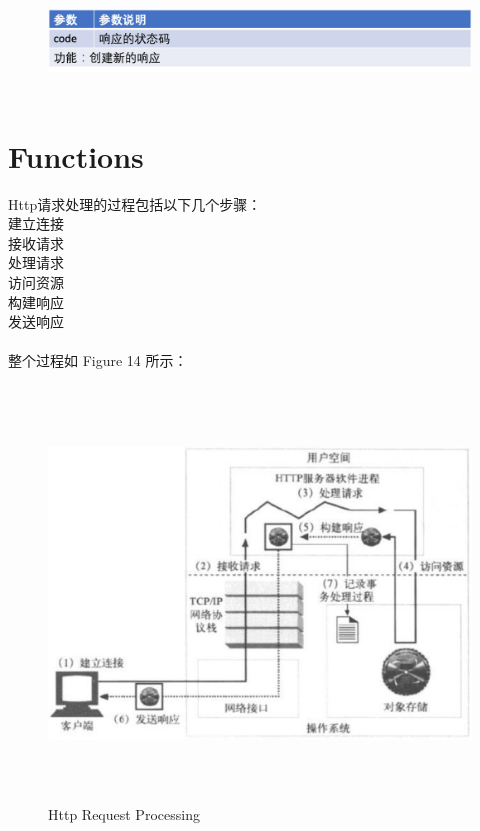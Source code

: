 \documentclass{article}
\begin{document}
	\begin{figure}[H]
		\centering
		\includegraphics[height = 2.8cm, width = 18cm]{pics/26_Response_table_3.png}	
	\end{figure}

	\section{Functions}
	\begin{CJK}{UTF8}{gbsn}
		Http请求处理的过程包括以下几个步骤：\\
		建立连接\\
		接收请求\\
		处理请求\\
		访问资源\\
		构建响应\\
		发送响应\\
		\hspace*{\fill} \\ %
		整个过程如 Figure 14 所示：
	\end{CJK}{}

	\begin{figure}[H]
		\centering
		\includegraphics[height = 11cm, width = 16cm]{pics/27_http_procedure.png}	
		\caption{Http Request Processing}
	\end{figure}
\end{document}
